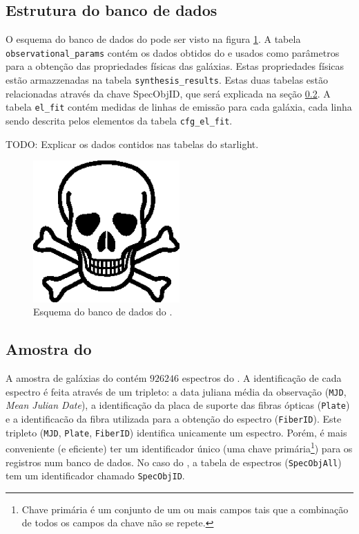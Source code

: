 \subsection{Estrutura do banco de dados}

O esquema do banco de dados do \starlight pode ser visto na figura
\ref{fig:EsquemaBDStarlight}. A tabela {\tt observational\_params} contém os
dados obtidos do \SDSS e usados como parâmetros para a obtenção das propriedades
físicas das galáxias. Estas propriedades físicas estão armazzenadas na tabela
{\tt synthesis\_results}. Estas duas tabelas estão relacionadas através da chave
{SpecObjID}, que será explicada na seção \ref{sec:Crossmatch:AmostraStarlight}.
A tabela {\tt el\_fit} contém medidas de linhas de emissão para cada galáxia,
cada linha sendo descrita pelos elementos da tabela {\tt cfg\_el\_fit}.

TODO: Explicar os dados contidos nas tabelas do starlight.

\begin{figure}
	\includegraphics[width=0.5\textwidth]{figuras/test.eps}
	\caption[Esquema do banco de dados do \starlight.]
	{Esquema do banco de dados do \starlight.}
	\label{fig:EsquemaBDStarlight}
\end{figure}

\subsection{Amostra do \STARLIGHT}
\label{sec:Crossmatch:AmostraStarlight}

A amostra de galáxias do \starlight contém $926246$ espectros do \SDSS. A
identificação de cada espectro é feita através de um tripleto: a data juliana
média da observação ({\tt MJD}, {\em Mean Julian Date}), a identificação da
placa de suporte das fibras ópticas ({\tt Plate}) e a identificacão da fibra
utilizada para a obtenção do espectro ({\tt FiberID}). Este tripleto ({\tt MJD},
{\tt Plate}, {\tt FiberID}) identifica unicamente um espectro. Porém, é mais
conveniente (e eficiente) ter um identificador único (uma chave
primária\footnote{Chave primária é um conjunto de um ou mais campos tais que a
combinação de todos os campos da chave não se repete.}) para os registros num
banco de dados. No caso do \SDSS, a tabela de espectros ({\tt SpecObjAll}) tem
um identificador chamado {\tt SpecObjID}.

